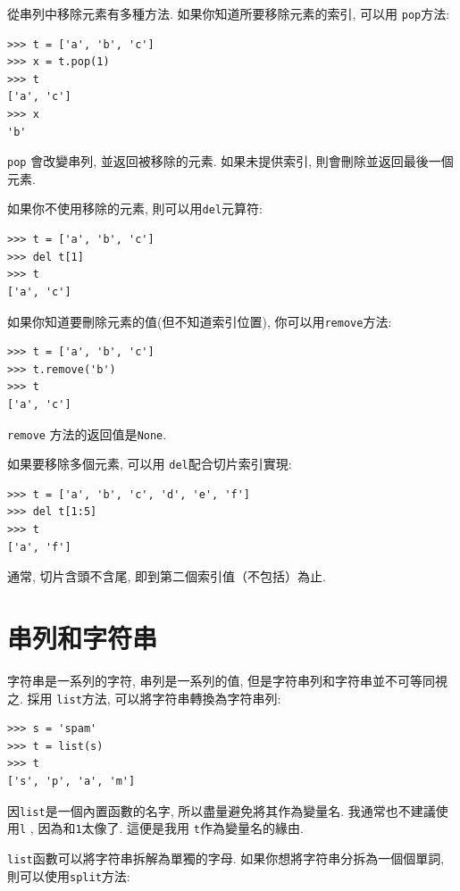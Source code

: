 \documentclass[10pt]{book}
\begin{document}
從串列中移除元素有多種方法. 
如果你知道所要移除元素的索引, 可以用
{\tt pop}方法:

\begin{verbatim}
>>> t = ['a', 'b', 'c']
>>> x = t.pop(1)
>>> t
['a', 'c']
>>> x
'b'
\end{verbatim}
%
{\tt pop} 會改變串列, 並返回被移除的元素. 
如果未提供索引, 則會刪除並返回最後一個元素. 

如果你不使用移除的元素, 則可以用{\tt del}元算符:

\begin{verbatim}
>>> t = ['a', 'b', 'c']
>>> del t[1]
>>> t
['a', 'c']
\end{verbatim}
%
如果你知道要刪除元素的值(但不知道索引位置), 你可以用{\tt remove}方法:

\begin{verbatim}
>>> t = ['a', 'b', 'c']
>>> t.remove('b')
>>> t
['a', 'c']
\end{verbatim}
%
{\tt remove} 方法的返回值是{\tt None}.

如果要移除多個元素, 可以用 {\tt del}配合切片索引實現:

\begin{verbatim}
>>> t = ['a', 'b', 'c', 'd', 'e', 'f']
>>> del t[1:5]
>>> t
['a', 'f']
\end{verbatim}
%
通常, 切片含頭不含尾, 即到第二個索引值（不包括）為止. 



\section{串列和字符串}

字符串是一系列的字符, 串列是一系列的值, 但是字符串列和字符串並不可等同視之. 
採用 {\tt list}方法, 可以將字符串轉換為字符串列:

\begin{verbatim}
>>> s = 'spam'
>>> t = list(s)
>>> t
['s', 'p', 'a', 'm']
\end{verbatim}
%
因{\tt list}是一個內置函數的名字, 所以盡量避免將其作為變量名. 
我通常也不建議使用{\tt l} , 因為和{\tt 1}太像了. 這便是我用
{\tt t}作為變量名的緣由. 

{\tt list}函數可以將字符串拆解為單獨的字母. 
如果你想將字符串分拆為一個個單詞, 則可以使用{\tt split}方法:
\end{document}
